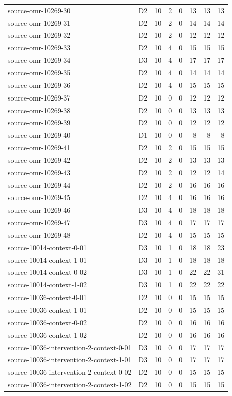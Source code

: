 \begin{longtable}{llrrrrrr}
source-omr-10269-30 & D2 & 10 & 2 & 0 & 13 & 13 & 13\\
source-omr-10269-31 & D2 & 10 & 2 & 0 & 14 & 14 & 14\\
source-omr-10269-32 & D2 & 10 & 2 & 0 & 12 & 12 & 12\\
source-omr-10269-33 & D2 & 10 & 4 & 0 & 15 & 15 & 15\\
source-omr-10269-34 & D3 & 10 & 4 & 0 & 17 & 17 & 17\\
source-omr-10269-35 & D2 & 10 & 4 & 0 & 14 & 14 & 14\\
source-omr-10269-36 & D2 & 10 & 4 & 0 & 15 & 15 & 15\\
source-omr-10269-37 & D2 & 10 & 0 & 0 & 12 & 12 & 12\\
source-omr-10269-38 & D2 & 10 & 0 & 0 & 13 & 13 & 13\\
source-omr-10269-39 & D2 & 10 & 0 & 0 & 12 & 12 & 12\\
source-omr-10269-40 & D1 & 10 & 0 & 0 & 8 & 8 & 8\\
source-omr-10269-41 & D2 & 10 & 2 & 0 & 15 & 15 & 15\\
source-omr-10269-42 & D2 & 10 & 2 & 0 & 13 & 13 & 13\\
source-omr-10269-43 & D2 & 10 & 2 & 0 & 12 & 12 & 14\\
source-omr-10269-44 & D2 & 10 & 2 & 0 & 16 & 16 & 16\\
source-omr-10269-45 & D2 & 10 & 4 & 0 & 16 & 16 & 16\\
source-omr-10269-46 & D3 & 10 & 4 & 0 & 18 & 18 & 18\\
source-omr-10269-47 & D3 & 10 & 4 & 0 & 17 & 17 & 17\\
source-omr-10269-48 & D2 & 10 & 4 & 0 & 15 & 15 & 15\\
source-10014-context-0-01 & D3 & 10 & 1 & 0 & 18 & 18 & 23\\
source-10014-context-1-01 & D3 & 10 & 1 & 0 & 18 & 18 & 18\\
source-10014-context-0-02 & D3 & 10 & 1 & 0 & 22 & 22 & 31\\
source-10014-context-1-02 & D3 & 10 & 1 & 0 & 22 & 22 & 22\\
source-10036-context-0-01 & D2 & 10 & 0 & 0 & 15 & 15 & 15\\
source-10036-context-1-01 & D2 & 10 & 0 & 0 & 15 & 15 & 15\\
source-10036-context-0-02 & D2 & 10 & 0 & 0 & 16 & 16 & 16\\
source-10036-context-1-02 & D2 & 10 & 0 & 0 & 16 & 16 & 16\\
source-10036-intervention-2-context-0-01 & D3 & 10 & 0 & 0 & 17 & 17 & 17\\
source-10036-intervention-2-context-1-01 & D3 & 10 & 0 & 0 & 17 & 17 & 17\\
source-10036-intervention-2-context-0-02 & D2 & 10 & 0 & 0 & 15 & 15 & 15\\
source-10036-intervention-2-context-1-02 & D2 & 10 & 0 & 0 & 15 & 15 & 15\\
\bottomrule\end{longtable}
